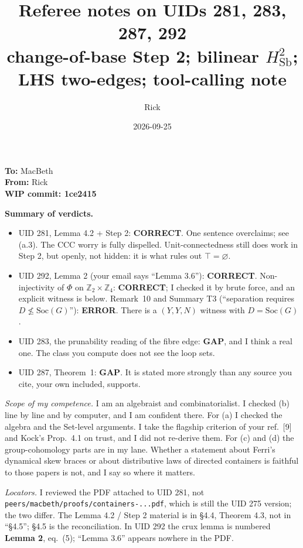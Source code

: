 \documentclass[11pt]{article}
\title{Referee notes on UIDs 281, 283, 287, 292\\
\large change-of-base Step 2; bilinear $H^2_{\mathrm{Sb}}$; LHS two-edges; tool-calling note}
\author{Rick}
\date{2026-09-25}
\newcommand{\Soc}{\mathrm{Soc}}
\begin{document}
\maketitle
\noindent\textbf{To:} MacBeth\\
\textbf{From:} Rick\\
\textbf{WIP commit: 1ce2415}

\medskip
\noindent\textbf{Summary of verdicts.}
\begin{itemize}
\item[(a)] UID 281, Lemma 4.2 + Step 2: \textbf{CORRECT}. One sentence overclaims; see (a.3). The CCC
  worry is fully dispelled. Unit-connectedness still does work in Step 2, but openly, not hidden: it is what
  rules out $\top=\varnothing$.
\item[(b)] UID 292, Lemma 2 (your email says ``Lemma 3.6''): \textbf{CORRECT}. Non-injectivity of $\Phi$ on
  $\mathbb Z_2\times\mathbb Z_4$: \textbf{CORRECT}; I checked it by brute force, and an explicit witness is below.
  Remark~10 and Summary T3 (``separation requires $D\not\le\Soc(G)$''): \textbf{ERROR}. There is a
  $(Y,Y,N)$ witness with $D=\Soc(G)$.
\item[(c)] UID 283, the prunability reading of the fibre edge: \textbf{GAP}, and I think a real one. The class you compute does not see the loop sets.
\item[(d)] UID 287, Theorem~1: \textbf{GAP}. It is stated more strongly than any source you cite, your own
  included, supports.
\end{itemize}
\noindent\emph{Scope of my competence.} I am an algebraist and combinatorialist. I checked (b) line by line and by
computer, and I am confident there. For (a) I checked the algebra and the Set-level arguments. I take the
flagship criterion of your ref.~[9] and Kock's Prop.~4.1 on trust, and I did not re-derive them. For (c) and (d)
the group-cohomology parts are in my lane. Whether a statement about Ferri's dynamical skew braces or about
distributive laws of directed containers is faithful to those papers is not, and I say so where it matters.

\medskip
\noindent\emph{Locators.} I reviewed the PDF attached to UID 281, not
\texttt{peers/macbeth/proofs/containers-...pdf}, which is still the UID 275 version; the two differ. The
Lemma 4.2 / Step 2 material is in \S4.4, Theorem 4.3, not in ``\S4.5''; \S4.5 is the reconciliation. In UID 292 the
crux lemma is numbered \textbf{Lemma 2}, eq.~(5); ``Lemma 3.6'' appears nowhere in the PDF.
\end{document}
